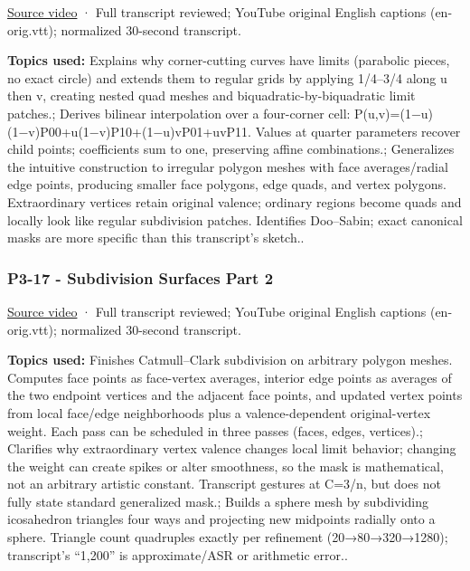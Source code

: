 \href{https://www.youtube.com/watch?v=9uscFr2Hht0}{Source video} · Full transcript reviewed; YouTube original English captions (en-orig.vtt); normalized 30-second transcript.

\textbf{Topics used:} Explains why corner-cutting curves have limits (parabolic pieces, no exact circle) and extends them to regular grids by applying 1/4--3/4 along u then v, creating nested quad meshes and biquadratic-by-biquadratic limit patches.; Derives bilinear interpolation over a four-corner cell: P(u,v)=(1−u)(1−v)P00+u(1−v)P10+(1−u)vP01+uvP11. Values at quarter parameters recover child points; coefficients sum to one, preserving affine combinations.; Generalizes the intuitive construction to irregular polygon meshes with face averages/radial edge points, producing smaller face polygons, edge quads, and vertex polygons. Extraordinary vertices retain original valence; ordinary regions become quads and locally look like regular subdivision patches. Identifies Doo--Sabin; exact canonical masks are more specific than this transcript's sketch..

\subsubsection{P3-17 - Subdivision Surfaces Part 2}\label{04-visual-computing-ii-ch036-p3-17---subdivision-surfaces-part-2}

\href{https://www.youtube.com/watch?v=THiF7-QxKXk}{Source video} · Full transcript reviewed; YouTube original English captions (en-orig.vtt); normalized 30-second transcript.

\textbf{Topics used:} Finishes Catmull--Clark subdivision on arbitrary polygon meshes. Computes face points as face-vertex averages, interior edge points as averages of the two endpoint vertices and the adjacent face points, and updated vertex points from local face/edge neighborhoods plus a valence-dependent original-vertex weight. Each pass can be scheduled in three passes (faces, edges, vertices).; Clarifies why extraordinary vertex valence changes local limit behavior; changing the weight can create spikes or alter smoothness, so the mask is mathematical, not an arbitrary artistic constant. Transcript gestures at C=3/n, but does not fully state standard generalized mask.; Builds a sphere mesh by subdividing icosahedron triangles four ways and projecting new midpoints radially onto a sphere. Triangle count quadruples exactly per refinement (20→80→320→1280); transcript's ``1,200'' is approximate/ASR or arithmetic error..

